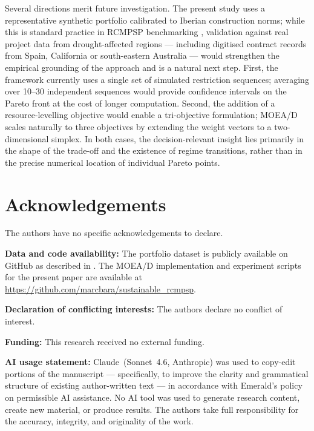 \documentclass[12pt,a4paper]{article}
\begin{document}
Several directions merit future investigation.  The present study uses a
representative synthetic portfolio calibrated to Iberian construction norms; while
this is standard practice in RCMPSP benchmarking \citep{Hartmann2022}, validation
against real project data from drought-affected regions --- including digitised
contract records from Spain, California or south-eastern Australia --- would
strengthen the empirical grounding of the approach and is a natural next step.
First, the framework currently uses a single set of simulated restriction sequences;
averaging over 10--30 independent sequences would provide confidence intervals on
the Pareto front at the cost of longer computation.  Second, the addition of a resource-levelling
objective would enable a tri-objective formulation; MOEA/D scales naturally to
three objectives by extending the weight vectors to a two-dimensional simplex.
In both cases, the decision-relevant insight lies primarily in the shape of the
trade-off and the existence of regime transitions, rather than in the precise
numerical location of individual Pareto points.

\section*{Acknowledgements}
\noindent The authors have no specific acknowledgements to declare.

\medskip\noindent
\textbf{Data and code availability:} The portfolio dataset is publicly available
on GitHub as described in \citet{Lostumbo2025}.  The MOEA/D implementation and
experiment scripts for the present paper are available at
\url{https://github.com/marcbara/sustainable_rcmpsp}.

\medskip\noindent
\textbf{Declaration of conflicting interests:} The authors declare no conflict of interest.

\medskip\noindent
\textbf{Funding:} This research received no external funding.

\medskip\noindent
\textbf{AI usage statement:} Claude~(Sonnet~4.6, Anthropic) was used to
copy-edit portions of the manuscript --- specifically, to improve the clarity
and grammatical structure of existing author-written text --- in accordance with
Emerald's policy on permissible AI assistance.  No AI tool was used to generate
research content, create new material, or produce results.  The authors take
full responsibility for the accuracy, integrity, and originality of the work.


\end{document}
